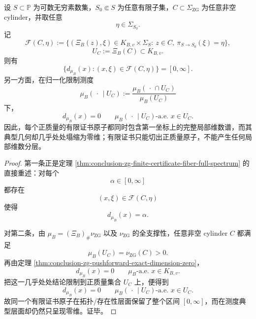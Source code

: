 \begin{theorem}[有限证书原子上的全谱反分层与零维典型性]\label{thm:conclusion-zg-finite-certificate-antistratification-zero-typicality}
设 \(S\subset\mathbb P\) 为可数无穷素数集，\(S_0\Subset S\) 为任意有限子集，\(C\subset\Sigma_{\mathrm{ZG}}\) 为任意非空 cylinder，并取任意
\[
\eta\in\Sigma_{S_0}.
\]
记
\[
\mathcal F(C,\eta)
:=
\{(\Xi_B(z),\xi)\in K_{B,v}\times\Sigma_S:\ z\in C,\ \pi_{S\to S_0}(\xi)=\eta\},
\]
\[
U_C:=\Xi_B(C)\subset K_{B,v}.
\]
则有
\[
\{d_{\mu_B}(x):(x,\xi)\in \mathcal F(C,\eta)\}=[0,\infty].
\]
另一方面，在归一化限制测度
\[
\mu_B(\,\cdot\,\mid U_C):=\frac{\mu_B(\,\cdot\,\cap U_C)}{\mu_B(U_C)}
\]
下，
\[
d_{\mu_B}(x)=0
\qquad
\mu_B(\,\cdot\,\mid U_C)\text{-a.e. }x\in U_C.
\]
因此，每个正质量的有限证书原子都同时包含第一坐标上的完整局部维数谱，而其典型几何却几乎处处塌缩为零维；有限证书只能切出正质量原子，不能产生任何局部维数分层。
\end{theorem}
\begin{proof}
第一条正是定理 \ref{thm:conclusion-zg-finite-certificate-fiber-full-spectrum} 的直接重述：对每个
\[
\alpha\in[0,\infty]
\]
都存在
\[
(x,\xi)\in\mathcal F(C,\eta)
\]
使得
\[
d_{\mu_B}(x)=\alpha.
\]

对第二条，由 \(\mu_B=(\Xi_B)_\#\nu_{\mathrm{ZG}}\) 以及 \(\nu_{\mathrm{ZG}}\) 的全支撑性，任意非空 cylinder \(C\) 都满足
\[
\mu_B(U_C)=\nu_{\mathrm{ZG}}(C)>0.
\]
再由定理 \ref{thm:conclusion-zg-pushforward-exact-dimension-zero}，
\[
d_{\mu_B}(x)=0
\qquad
\mu_B\text{-a.e. }x\in K_{B,v}.
\]
把这一几乎处处结论限制到正质量集合 \(U_C\) 上，便得到
\[
d_{\mu_B}(x)=0
\qquad
\mu_B(\,\cdot\,\mid U_C)\text{-a.e. }x\in U_C.
\]
故同一个有限证书原子在拓扑/存在性层面保留了整个区间 \([0,\infty]\)，而在测度典型层面却仍然只呈现零维。证毕。
\end{proof}

